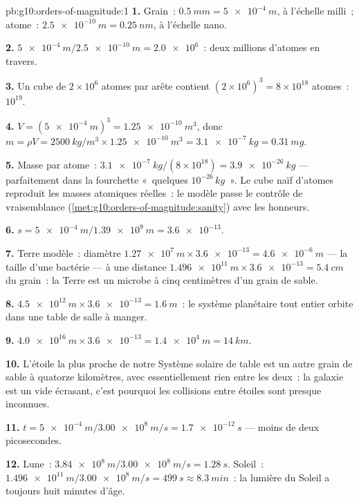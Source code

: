 \begin{solution}{pb:g10:orders-of-magnitude:1}
\textbf{1.} Grain~: $\qty{0.5}{mm} = \qty{5e-4}{m}$, à l'échelle
milli~; atome~: $\qty{2.5e-10}{m} = \qty{0.25}{nm}$, à l'échelle nano.

\textbf{2.} $\qty{5e-4}{m}/\qty{2.5e-10}{m} = \num{2.0e6}$~: deux
millions d'atomes en travers.

\textbf{3.} Un cube de $2 \times 10^{6}$ atomes par arête contient
$(2\times10^{6})^{3} = 8 \times 10^{18}$ atomes~: 
$10^{19}$.

\textbf{4.} $V = (\qty{5e-4}{m})^{3} = \qty{1.25e-10}{m^3}$, donc
$m = \rho V = \qty{2500}{kg/m^3} \times \qty{1.25e-10}{m^3}
= \qty{3.1e-7}{kg} = \qty{0.31}{mg}$.

\textbf{5.} Masse par atome~:
$\qty{3.1e-7}{kg}/(8\times10^{18}) = \qty{3.9e-26}{kg}$ ---
parfaitement dans la fourchette «~quelques
$10^{-26}\,\unit{kg}$~». Le cube naïf d'atomes reproduit les masses
atomiques réelles~: le modèle passe le contrôle de vraisemblance
(\cref{met:g10:orders-of-magnitude:sanity}) avec les honneurs.

\textbf{6.} $s = \qty{5e-4}{m}/\qty{1.39e9}{m} = \num{3.6e-13}$.

\textbf{7.} Terre modèle~: diamètre
$\qty{1.27e7}{m} \times \num{3.6e-13} = \qty{4.6e-6}{m}$ --- la taille
d'une bactérie --- à une distance
$\qty{1.496e11}{m} \times \num{3.6e-13} = \qty{5.4}{cm}$ du grain~: la
Terre est un microbe à cinq centimètres d'un grain de sable.

\textbf{8.} $\qty{4.5e12}{m} \times \num{3.6e-13} = \qty{1.6}{m}$~: le
système planétaire tout entier orbite dans une table de salle à manger.

\textbf{9.} $\qty{4.0e16}{m} \times \num{3.6e-13} = \qty{1.4e4}{m}
= \qty{14}{km}$.

\textbf{10.} L'étoile la plus proche de notre Système solaire de table
est un autre grain de sable à quatorze kilomètres, avec essentiellement
rien entre les deux~: la galaxie est un vide écrasant, c'est pourquoi
les collisions entre étoiles sont presque inconnues.

\textbf{11.} $t = \qty{5e-4}{m}/\qty{3.00e8}{m/s} = \qty{1.7e-12}{s}$
--- moins de deux picosecondes.

\textbf{12.} Lune~: $\qty{3.84e8}{m}/\qty{3.00e8}{m/s} =
\qty{1.28}{s}$. Soleil~: $\qty{1.496e11}{m}/\qty{3.00e8}{m/s} =
\qty{499}{s} \approx \qty{8.3}{min}$~: la lumière du Soleil a toujours
huit minutes d'âge.


\end{solution}
